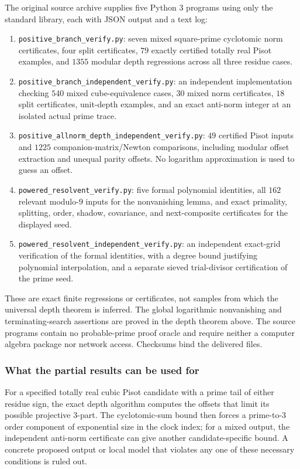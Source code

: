\documentclass[11pt,a4paper]{article}
\theoremstyle{definition}\newtheorem{definition}[theorem]{Definition}
\theoremstyle{remark}\newtheorem{remark}[theorem]{Remark}
\begin{document}
The original source archive supplies five Python 3 programs using only the standard
library, each with JSON output and a text log:
\begin{enumerate}
\item \texttt{positive\_branch\_verify.py}: seven mixed square-prime
cyclotomic norm certificates, four split certificates, $79$ exactly
certified totally real Pisot examples, and $1355$ modular depth
regressions across all three residue cases.
\item \texttt{positive\_branch\_independent\_verify.py}: an independent
implementation checking $540$ mixed cube-equivalence cases, $30$ mixed
norm certificates, $18$ split certificates, unit-depth examples, and an
exact anti-norm integer at an isolated actual prime trace.
\item \texttt{positive\_allnorm\_depth\_independent\_verify.py}:
$49$ certified Pisot inputs and $1225$ companion-matrix/Newton
comparisons, including modular offset extraction and unequal parity
offsets. No logarithm approximation is used to guess an offset.
\item \texttt{powered\_resolvent\_verify.py}: five formal polynomial
identities, all $162$ relevant modulo-$9$ inputs for the nonvanishing
lemma, and exact primality, splitting, order, shadow, covariance, and
next-composite certificates for the displayed seed.
\item \texttt{powered\_resolvent\_independent\_verify.py}:
an independent exact-grid verification of the formal identities, with
a degree bound justifying polynomial interpolation, and a separate
sieved trial-divisor certification of the prime seed.
\end{enumerate}
These are exact finite regressions or certificates, not samples from which
the universal depth theorem is inferred. The global logarithmic
nonvanishing and terminating-search assertions are proved in the depth theorem above.
The source programs contain no probable-prime proof oracle and require
neither a computer algebra package nor network access. Checksums bind the
delivered files. 

\subsubsection{What the partial results can be used for}

For a specified totally real cubic Pisot candidate with a prime tail of either residue sign, the exact depth algorithm computes the offsets that limit its
possible projective $3$-part. The cyclotomic-sum bound then forces a
prime-to-$3$ order component of exponential size in the clock index;
for a mixed output, the independent anti-norm certificate can give another
candidate-specific bound. A concrete proposed output or local model that
violates any one of these necessary conditions is ruled out.
\end{document}
